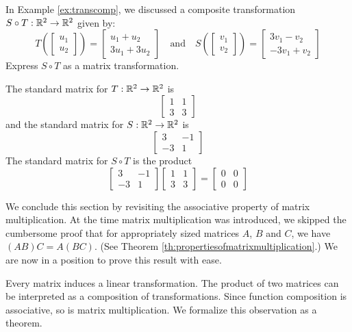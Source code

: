 \documentclass{ximera}
\begin{document}
 
\begin{example}\label{ex:standardmatofcomp}
In Example \ref{ex:transcomp}, we discussed a composite transformation $S\circ T:\mathbb{R}^2\rightarrow \mathbb{R}^2$
given by:
$$T\left(\begin{bmatrix}u_1\\u_2\end{bmatrix}\right)=\begin{bmatrix}u_1+u_2\\3u_1+3u_2\end{bmatrix}\quad \text{and} \quad
S\left(\begin{bmatrix}v_1\\v_2\end{bmatrix}\right)=\begin{bmatrix}3v_1-v_2\\-3v_1+v_2\end{bmatrix}$$
Express $S\circ T$ as a matrix transformation.
\begin{explanation}
The standard matrix for $T:\mathbb{R}^2\rightarrow \mathbb{R}^2$ is $$\begin{bmatrix}1&1\\3&3\end{bmatrix}$$ and the standard matrix for $S:\mathbb{R}^2\rightarrow \mathbb{R}^2$ is $$\begin{bmatrix}3&-1\\-3&1\end{bmatrix}$$
The standard matrix for $S\circ T$ is the product
$$\begin{bmatrix}3&-1\\-3&1\end{bmatrix}\begin{bmatrix}1&1\\3&3\end{bmatrix}=\begin{bmatrix}0&0\\0&0\end{bmatrix}$$
\end{explanation}
\end{example}

 
We conclude this section by revisiting the associative property of matrix multiplication.  At the time matrix multiplication was introduced, we skipped the cumbersome proof that for appropriately sized matrices $A$, $B$ and $C$, we have $(AB)C=A(BC)$. (See Theorem \ref{th:propertiesofmatrixmultiplication}.)  We are now in a position to prove this result with ease. 
 
Every matrix induces a linear transformation.  The product of two matrices can be interpreted as a composition of transformations.  Since function composition is associative, so is matrix multiplication. We formalize this observation as a theorem.
 
\end{document}
